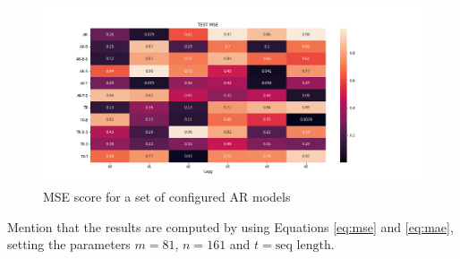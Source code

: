 \begin{table}[h]
    \centering
    \caption{Configuration of \acrshort{ar}-models. $\times$ denoted not applied, \checked denotes applied. \textbf{Bruk denne for tre eksempler, gjør de mer ulike, velg gjerne best ++ .}}
    \label{tab:ar_model_config}
\end{table}

\begin{figure}
    \centering
    \includegraphics[scale = 0.5]{python_figs/MSE_score_AR_models.png}
    \caption{MSE score for a set of configured AR models}
    \label{fig:results_ar_models}
\end{figure}

Mention that the results are computed by using Equations \eqref{eq:mse} and \eqref{eq:mae}, setting the parameters $m = 81$, $n=161$ and $t=\text{seq length}$. 

